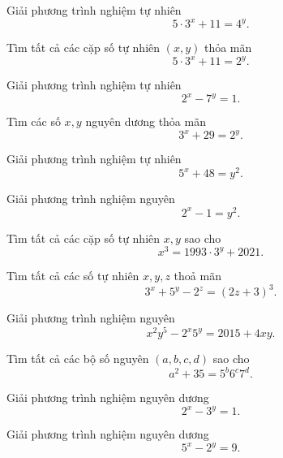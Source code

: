 \begin{btt}
Giải phương trình nghiệm tự nhiên \[5\cdot 3^x+11=4^y.\]
\end{btt}

\begin{btt}
Tìm tất cả các cặp số tự nhiên $(x,y)$ thỏa mãn $$5\cdot 3^x+11=2^y.$$
\end{btt}

\begin{btt}
Giải phương trình nghiệm tự nhiên $$2^x-7^y=1.$$
\end{btt}

\begin{btt}
Tìm các số $x,y$ nguyên dương thỏa mãn $$3^x+29=2^y.$$
\end{btt}

\begin{btt}
Giải phương trình nghiệm tự nhiên $$5^x+48=y^2.$$ 
\end{btt}

\begin{btt}
Giải phương trình nghiệm nguyên $$2^x-1=y^2.$$  
\end{btt}

\begin{btt}
Tìm tất cả các cặp số tự nhiên $x,y$ sao cho 
\[x^{3}=1993 \cdot 3^{y}+2021.\]
\end{btt}

\begin{btt}
Tìm tất cả các số tự nhiên $x,y,z$ thoả mãn
\[3^x+5^y-2^z=\left(2z+3\right)^3.\]
\end{btt}

\begin{btt}
Giải phương trình nghiệm nguyên 
$$x^2y^5-2^x5^y=2015+4xy.$$
\end{btt}

\begin{btt}
Tìm tất cả các bộ số nguyên $(a, b, c, d)$ sao cho
\[a^{2}+35=5^{b}6^{c}7^{d}.\]
\end{btt}

\begin{btt}
Giải phương trình nghiệm nguyên dương $$2^x-3^y=1.$$
\end{btt}

\begin{btt}
Giải phương trình nghiệm nguyên dương $$5^x-2^y=9.$$
\end{btt}

